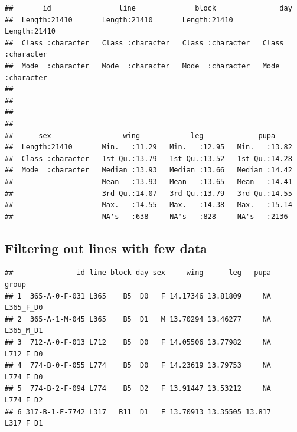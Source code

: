 \documentclass[
]{article}
\newenvironment{Shaded}{\begin{snugshade}}{\end{snugshade}}
\newcommand{\CommentTok}[1]{\textcolor[rgb]{0.56,0.35,0.01}{\textit{#1}}}
\newcommand{\DataTypeTok}[1]{\textcolor[rgb]{0.13,0.29,0.53}{#1}}
\newcommand{\KeywordTok}[1]{\textcolor[rgb]{0.13,0.29,0.53}{\textbf{#1}}}
\newcommand{\NormalTok}[1]{#1}
\newcommand{\OperatorTok}[1]{\textcolor[rgb]{0.81,0.36,0.00}{\textbf{#1}}}
\newcommand{\StringTok}[1]{\textcolor[rgb]{0.31,0.60,0.02}{#1}}
\begin{document}
\begin{verbatim}
##       id                line              block               day           
##  Length:21410       Length:21410       Length:21410       Length:21410      
##  Class :character   Class :character   Class :character   Class :character  
##  Mode  :character   Mode  :character   Mode  :character   Mode  :character  
##                                                                             
##                                                                             
##                                                                             
##                                                                             
##      sex                 wing            leg             pupa      
##  Length:21410       Min.   :11.29   Min.   :12.95   Min.   :13.82  
##  Class :character   1st Qu.:13.79   1st Qu.:13.52   1st Qu.:14.28  
##  Mode  :character   Median :13.93   Median :13.66   Median :14.42  
##                     Mean   :13.93   Mean   :13.65   Mean   :14.41  
##                     3rd Qu.:14.07   3rd Qu.:13.79   3rd Qu.:14.55  
##                     Max.   :14.55   Max.   :14.38   Max.   :15.14  
##                     NA's   :638     NA's   :828     NA's   :2136
\end{verbatim}

\hypertarget{filtering-out-lines-with-few-data}{%
\subsection{Filtering out lines with few
data}\label{filtering-out-lines-with-few-data}}

\begin{Shaded}
\end{Shaded}

\begin{verbatim}
##               id line block day sex     wing      leg   pupa     group
## 1  365-A-0-F-031 L365    B5  D0   F 14.17346 13.81809     NA L365_F_D0
## 2  365-A-1-M-045 L365    B5  D1   M 13.70294 13.46277     NA L365_M_D1
## 3  712-A-0-F-013 L712    B5  D0   F 14.05506 13.77982     NA L712_F_D0
## 4  774-B-0-F-055 L774    B5  D0   F 14.23619 13.79753     NA L774_F_D0
## 5  774-B-2-F-094 L774    B5  D2   F 13.91447 13.53212     NA L774_F_D2
## 6 317-B-1-F-7742 L317   B11  D1   F 13.70913 13.35505 13.817 L317_F_D1
\end{verbatim}
\end{document}
